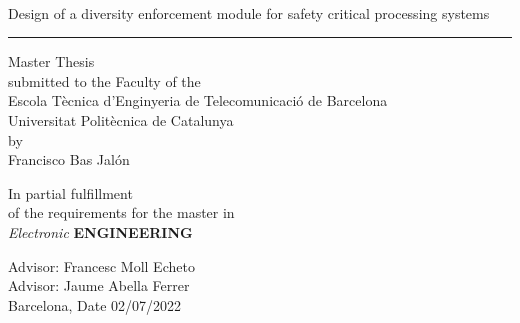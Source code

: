\documentclass[a4paper,12pt]{article}
\begin{document}
\thispagestyle{empty}
\begin{center}
{\sffamily 
{}\\
\vspace{1cm}
{\Huge Design of a diversity enforcement module for safety critical processing systems}\\
\vspace{0.5cm}
{\color{black}\hrule height 1pt}
\vspace{1cm}
{\large{Master Thesis\\
submitted to the Faculty of the \\
Escola T\`ecnica d'Enginyeria de Telecomunicaci\'o de Barcelona \\
Universitat Polit\`ecnica de Catalunya \\
by\\
\vspace{0.4cm}
Francisco Bas Jalón}}

\nocite{*} %

\vspace{1.5cm}

{In partial fulfillment\\
of the requirements for the master in\\
\textit{Electronic} \textbf{ENGINEERING}}

\vspace{2cm}

{{Advisor: Francesc Moll Echeto}} \\
{{Advisor: Jaume Abella Ferrer}} \\
{{Barcelona, Date 02/07/2022}}
\thispagestyle{alim}
}

\end{center}
\newpage
\tableofcontents
\end{document}
